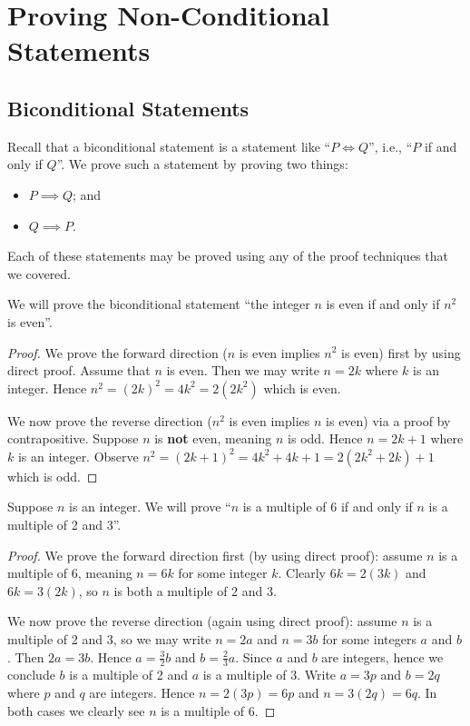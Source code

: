 \section{Proving Non-Conditional Statements}
\subsection{Biconditional Statements}
Recall that a biconditional statement is a statement like ``$P \iff Q$'', i.e., ``$P$ if and only if $Q$''. We prove such a statement by proving two things:
\begin{itemize}
    \item $P \implies Q$; and
    \item $Q \implies P$.
\end{itemize}
Each of these statements may be proved using any of the proof techniques that we covered.

\begin{example}
    We will prove the biconditional statement ``the integer $n$ is even if and only if $n^2$ is even''.
    \begin{proof}
        We prove the forward direction ($n$ is even implies $n^2$ is even) first by using direct proof. Assume that $n$ is even. Then we may write $n = 2k$ where $k$ is an integer. Hence $n^2 = (2k)^2 = 4k^2 = 2(2k^2)$ which is even.

        We now prove the reverse direction ($n^2$ is even implies $n$ is even) via a proof by contrapositive. Suppose $n$ is \textbf{not} even, meaning $n$ is odd. Hence $n = 2k + 1$ where $k$ is an integer. Observe $n^2 = (2k+1)^2 = 4k^2 + 4k + 1 = 2(2k^2 + 2k) + 1$ which is odd.
    \end{proof}
\end{example}
\begin{example}
    Suppose $n$ is an integer. We will prove ``$n$ is a multiple of 6 if and only if $n$ is a multiple of 2 and 3''.
    \begin{proof}
        We prove the forward direction first (by using direct proof): assume $n$ is a multiple of 6, meaning $n = 6k$ for some integer $k$. Clearly $6k = 2(3k)$ and $6k = 3(2k)$, so $n$ is both a multiple of 2 and 3.
        
        We now prove the reverse direction (again using direct proof): assume $n$ is a multiple of 2 and 3, so we may write $n = 2a$ and $n = 3b$ for some integers $a$ and $b$. Then $2a = 3b$. Hence $a = \frac 32 b$ and $b = \frac 23 a$. Since $a$ and $b$ are integers, hence we conclude $b$ is a multiple of 2 and $a$ is a multiple of 3. Write $a = 3p$ and $b = 2q$ where $p$ and $q$ are integers. Hence $n = 2(3p) = 6p$ and $n = 3(2q) = 6q$. In both cases we clearly see $n$ is a multiple of 6.
    \end{proof}
\end{example}

